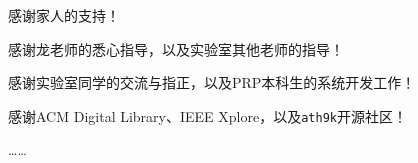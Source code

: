 
\begin{thanks}

  感谢家人的支持！

  感谢龙老师的悉心指导，以及实验室其他老师的指导！

  感谢实验室同学的交流与指正，以及PRP本科生的系统开发工作！

  感谢ACM Digital Library、IEEE Xplore，以及\texttt{ath9k}开源社区！
  
  ……

\end{thanks}
